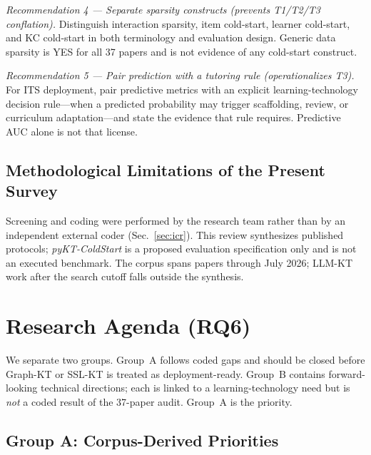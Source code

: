 \documentclass[lettersize,journal]{IEEEtran}
\begin{document}
\textit{Recommendation 4 --- Separate sparsity constructs (prevents T1/T2/T3 conflation).} Distinguish interaction sparsity, item cold-start, learner cold-start, and KC cold-start in both terminology and evaluation design. Generic data sparsity is YES for all 37 papers and is not evidence of any cold-start construct.

\textit{Recommendation 5 --- Pair prediction with a tutoring rule (operationalizes T3).} For ITS deployment, pair predictive metrics with an explicit learning-technology decision rule---when a predicted probability may trigger scaffolding, review, or curriculum adaptation---and state the evidence that rule requires. Predictive AUC alone is not that license.

\subsection{Methodological Limitations of the Present Survey}
Screening and coding were performed by the research team rather than by an independent external coder (Sec.~\ref{sec:icr}). This review synthesizes published protocols; \emph{pyKT-ColdStart} is a proposed evaluation specification only and is not an executed benchmark. The corpus spans papers through July 2026; LLM-KT work after the search cutoff falls outside the synthesis.

\section{Research Agenda (RQ6)}
\label{sec:agenda}

We separate two groups. Group~A follows coded gaps and should be closed before Graph-KT or SSL-KT is treated as deployment-ready. Group~B contains forward-looking technical directions; each is linked to a learning-technology need but is \emph{not} a coded result of the 37-paper audit. Group~A is the priority.

\subsection{Group A: Corpus-Derived Priorities}
\end{document}
